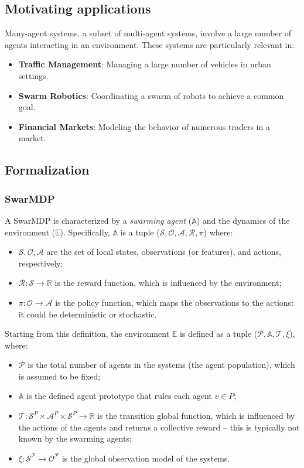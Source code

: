 \subsection{Motivating applications}
Many-agent systems, a subset of multi-agent systems, involve a large number of agents interacting in an environment. These systems are particularly relevant in:

\begin{itemize}
    \item \textbf{Traffic Management}: Managing a large number of vehicles in urban settings.
    \item \textbf{Swarm Robotics}: Coordinating a swarm of robots to achieve a common goal.
    \item \textbf{Financial Markets}: Modeling the behavior of numerous traders in a market.
\end{itemize}

\subsection{Formalization}
\subsubsection{SwarMDP}
A SwarMDP is characterized by a \emph{swarming agent} ($\mathbb{A}$) and the dynamics of the environment ($\mathbb{E}$).
Specifically, $\mathbb{A}$ is a tuple ($\mathcal{S}, \mathcal{O}, \mathcal{A}, \mathcal{R}, \pi$) where:
\begin{itemize}
  \item $\mathcal{S, O, A}$ are the set of local states, observations (or features), and actions, respectively;
  \item $\mathcal{R}: \mathcal{S} \rightarrow \mathbb{R}$ is the reward function, which is influenced by the environment;
  \item $\pi: \mathcal{O} \rightarrow \mathcal{A}$ is the policy function, which maps the observations to the actions: it could be deterministic or stochastic.
\end{itemize}
Starting from this definition, the environment $\mathbb{E}$ is defined as a tuple ($\mathcal{P}, \mathbb{A}, \mathcal{T}, \xi$), where:
\begin{itemize}
  \item $\mathcal{P}$ is the total number of agents in the systems (the agent population), which is assumed to be fixed;
  \item $\mathbb{A}$ is the defined agent prototype that rules each agent $v \in P$;
  \item $\mathcal{T}: \mathcal{S}^P \times \mathcal{A}^P \times \mathcal{S}^P \rightarrow \mathbb{R}$ is the transition  global function, which is influenced by the actions of the agents and returns a collective reward -- this is typically not known by the swarming agents;
  \item $\xi: \mathcal{S^P} \rightarrow \mathcal{O^P}$ is the global observation model of the systems.
\end{itemize}
